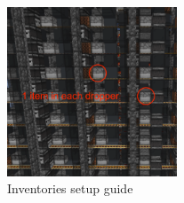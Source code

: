 \documentclass[10pt]{datasheet}
\begin{document}
\begin{figure}[h]
    \includegraphics[width=0.45\textwidth]{invs.png}
    \caption{Inventories setup guide}
\end{figure}
\end{document}
